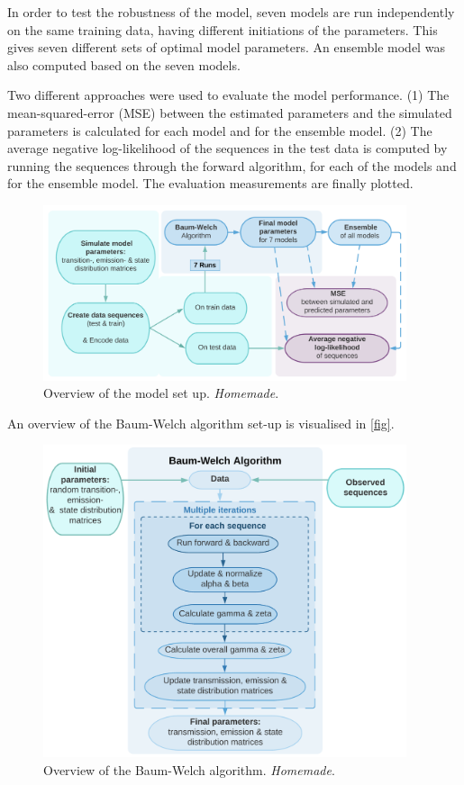 In order to test the robustness of the model, seven models are run independently on the same training data, having different initiations of the parameters. This gives seven different sets of optimal model parameters. An ensemble model was also computed based on the seven models.

Two different approaches were used to evaluate the model performance. (1) The mean-squared-error (MSE) between the estimated parameters and the simulated parameters is calculated for each model and for the ensemble model. (2) The average negative log-likelihood of the sequences in the test data is computed by running the sequences through the forward algorithm, for each of the models and for the ensemble model. The evaluation measurements are finally plotted.

\begin{figure}[H]
    \centering
    \includegraphics[width = 0.95\textwidth]{fig/Overall_setup.png}
    \caption{Overview of the model set up. \textit{Homemade}.}
    \label{fig:set_up}
\end{figure}

An overview of the Baum-Welch algorithm set-up is visualised in \autoref{fig}. 
\begin{figure}[H]
    \centering
    \includegraphics[width = 0.95\textwidth]{fig/baum_welch.png}
    \caption{Overview of the Baum-Welch algorithm. \textit{Homemade}.}
    \label{fig:BW}
\end{figure}

